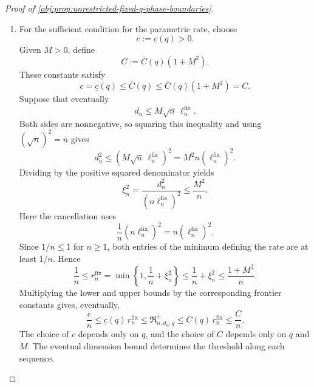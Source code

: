 \begin{proof}[Proof of \cref{obj:prop:unrestricted-fixed-q-phase-boundaries}]
\begin{enumerate}
It remains to handle the truncation. If
\(r_n^{\mathrm{fix}}\to0\), then eventually
\[
r_n^{\mathrm{fix}}=\min\{1,\nu_n+\xi_n^2\}<1.
\]
At every such index,
\[
\nu_n+\xi_n^2<1,
\qquad
r_n^{\mathrm{fix}}=\nu_n+\xi_n^2:
\]
indeed, \(\nu_n+\xi_n^2\ge1\) would make the minimum equal to \(1\).
Thus \(\nu_n+\xi_n^2\to0\), and
\[
0\le\xi_n^2\le\nu_n+\xi_n^2
\]
implies \(\xi_n^2\to0\). Conversely, if \(\xi_n^2\to0\), then
\[
\nu_n+\xi_n^2\longrightarrow0,
\qquad
\min\{1,\nu_n+\xi_n^2\}\longrightarrow\min\{1,0\}=0,
\]
by continuity of addition and the minimum.

Consequently,
\[
r_n^{\mathrm{fix}}\longrightarrow0
\quad\Longleftrightarrow\quad
\xi_n^2\longrightarrow0
\quad\Longleftrightarrow\quad
\xi_n\longrightarrow0
\quad\Longleftrightarrow\quad
d_n=o\!\left(n\log(e+n)\right).
\]
Together with the risk comparison, this proves the first assertion.

\item For the sufficient condition for the parametric rate, choose
\[
c:=\underline c(q)>0.
\]
Given \(M>0\), define
\[
C:=\overline C(q)(1+M^2).
\]
These constants satisfy
\[
c=\underline c(q)
\le\overline C(q)
\le\overline C(q)(1+M^2)=C.
\]
Suppose that eventually
\[
d_n\le M\sqrt n\,\ell_n^{\mathrm{fix}}.
\]
Both sides are nonnegative, so squaring this inequality and using
\((\sqrt n)^2=n\) gives
\[
d_n^2
\le\left(M\sqrt n\,\ell_n^{\mathrm{fix}}\right)^2
=M^2n\left(\ell_n^{\mathrm{fix}}\right)^2.
\]
Dividing by the positive squared denominator yields
\[
\xi_n^2
=\frac{d_n^2}{(n\ell_n^{\mathrm{fix}})^2}
\le\frac{M^2}{n}.
\]
Here the cancellation uses
\[
\frac1n(n\ell_n^{\mathrm{fix}})^2
=n\left(\ell_n^{\mathrm{fix}}\right)^2.
\]
Since \(1/n\le1\) for \(n\ge1\), both entries of the minimum defining the rate are at least \(1/n\). Hence
\[
\frac1n
\le r_n^{\mathrm{fix}}
=\min\left\{1,\frac1n+\xi_n^2\right\}
\le\frac1n+\xi_n^2
\le\frac{1+M^2}{n}.
\]
Multiplying the lower and upper bounds by the corresponding frontier constants gives, eventually,
\[
\frac{c}{n}
\le\underline c(q)\,r_n^{\mathrm{fix}}
\le\mathfrak R^{+}_{n,d_n,q}
\le\overline C(q)\,r_n^{\mathrm{fix}}
\le\frac{C}{n}.
\]
The choice of \(c\) depends only on \(q\), and the choice of \(C\) depends only on \(q\) and \(M\). The eventual dimension bound determines the threshold along each sequence.


\end{enumerate}
\end{proof}
